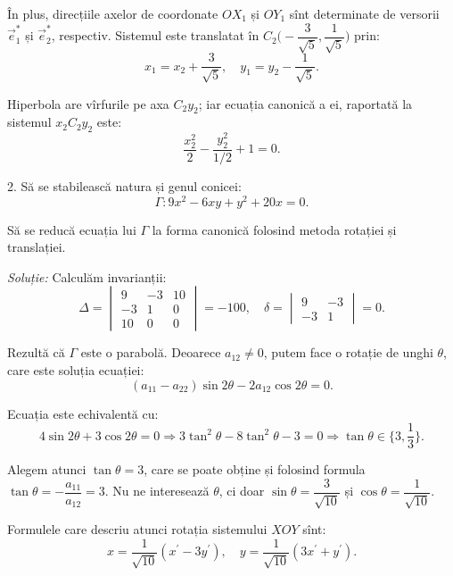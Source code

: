 \documentclass[11pt,a4paper]{article}
\theoremstyle{dotless}
\theoremstyle{dotlessdr}
\begin{document}
În plus, direcțiile axelor de coordonate $OX_1$ și $OY_1$ sînt determinate de
versorii $\vec{e}_1^\ast$ și $\vec{e}_2^\ast$, respectiv. Sistemul este
translatat în $C_2 \Big( -\dfrac{3}{\sqrt{5}}, \dfrac{1}{\sqrt{5}} \Big)$ prin: 
 \[
	x_1 = x_2 + \dfrac{3}{\sqrt{5}}, \quad y_1 = y_2 - \dfrac{1}{\sqrt{5}}.
\]

Hiperbola are vîrfurile pe axa $C_2y_2$; iar ecuația canonică a ei, raportată
la sistemul $x_2C_2y_2$ este: 
 \[
	\dfrac{x_2^2}{2} - \dfrac{y_2^2}{1/2} + 1 = 0.
\]



2. Să se stabilească natura și genul conicei: 
 \[
	\Gamma : 9x^2 - 6xy + y^2 + 20x = 0.
\]

Să se reducă ecuația lui $\Gamma$ la forma canonică folosind metoda rotației
și translației.

\emph{Soluție:}
	Calculăm invarianții: 
 \[
	\Delta = \begin{vmatrix}
	             9 & -3 & 10 \\
	            -3 & 1 & 0 \\
	            10 & 0 & 0
             \end{vmatrix} = -100, \quad \delta = \begin{vmatrix}
	                                                  9 & -3 \\
	                                                  -3 & 1
                                                  \end{vmatrix} = 0.
\]

Rezultă că $\Gamma$ este o parabolă. Deoarece $a_{12} \neq 0$, putem face o
rotație de unghi $\theta$, care este soluția ecuației: 
 \[
	(a_{11} - a_{22}) \sin 2\theta - 2 a_{12} \cos 2 \theta = 0.
\]

Ecuația este echivalentă cu: 
 \[
	4 \sin 2 \theta + 3 \cos 2 \theta = 0 \Longrightarrow 
	3 \tan^2 \theta - 8 \tan^2 \theta - 3 = 0 \Longrightarrow 
	\tan\theta \in \{3, \frac{1}{3} \}.
\]

Alegem atunci $\tan \theta = 3$, care se poate obține și folosind formula
$\tan \theta = - \dfrac{a_{11}}{a_{12}} = 3$. Nu ne interesează $\theta$, ci
doar $\sin\theta = \dfrac{3}{\sqrt{10}}$ și $\cos\theta = \dfrac{1}{\sqrt{10}}$.

Formulele care descriu atunci rotația sistemului $XOY$ sînt: 
 \[
	x = \dfrac{1}{\sqrt{10}}(x^{\prime} - 3y^{\prime}), \quad
	y = \dfrac{1}{\sqrt{10}}(3x^{\prime} + y^{\prime}).
\]
\end{document}
